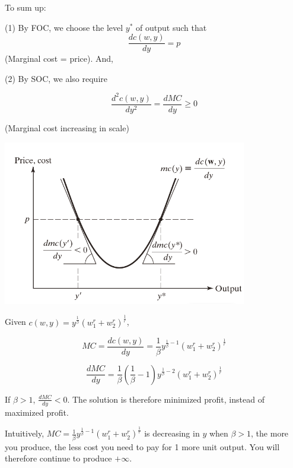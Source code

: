 \documentclass{article}
\begin{document}
\begin{mdframed}[backgroundcolor=blue!20,linecolor=white]
\vspace{3mm}

To sum up:


(1) By FOC, we choose the level $y^*$ of output such that 
$$\frac{dc(w,y)}{dy}= p$$
(Marginal cost = price). And,

(2) By SOC, we also require 

$$\frac{d^2c(w,y)}{dy^2} = \frac{d MC}{dy} \ge 0$$

(Marginal cost increasing in scale)


\vspace{2mm}
{\centering
\includegraphics[width=0.8\textwidth]{5.mc}
\label{fig:mc}}
\vspace{2mm}

\end{mdframed}

Given $c(w,y) = y^{\frac{1}{\beta}}{(w_1^r + w_2^r)^{\frac{1}{r}}} $,

$$MC=\frac{dc(w,y)}{dy}= \frac{1}{\beta}  y^{\frac{1}{\beta} - 1}{(w_1^r + w_2^r)^{\frac{1}{r}}}$$

$$\frac{d MC}{dy} = \frac{1}{\beta}(\frac{1}{\beta} - 1)  y^{\frac{1}{\beta} - 2}{(w_1^r + w_2^r)^{\frac{1}{r}}}$$


If $\beta >1$, $\frac{d MC}{dy} < 0$. The solution is therefore minimized profit, instead of maximized profit.

\begin{mdframed}[backgroundcolor=blue!20,linecolor=white]
Intuitively, $MC=\frac{1}{\beta}  y^{\frac{1}{\beta} - 1}{(w_1^r + w_2^r)^{\frac{1}{r}}}$ is decreasing in $y$ when $\beta > 1$, the more you produce, the less cost you need to pay for 1 more unit output. You will therefore continue to produce $+\infty$.

\end{mdframed}
\end{document}
